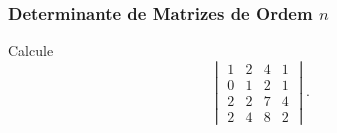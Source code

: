 
\begin{frame}
    \frametitle{Determinante de Matrizes de Ordem $n$}

    
    \begin{exemplo}
        Calcule
        \begin{displaymath}  
            \begin{vmatrix}
                1 & 2 & 4 & 1 \\
                0 & 1 & 2 & 1 \\
                2 & 2 & 7 & 4\\
                2 & 4 & 8 & 2
            \end{vmatrix}.
        \end{displaymath}
    \end{exemplo}
\end{frame}


